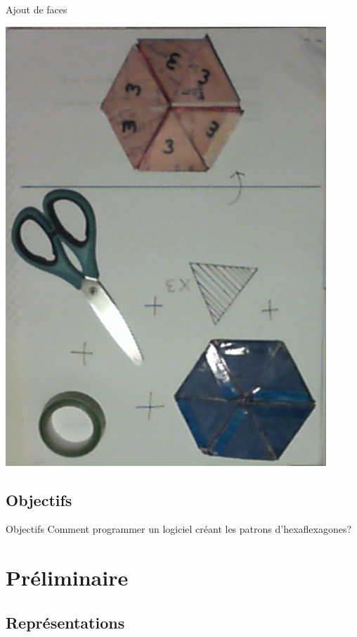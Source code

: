 \documentclass[french,xcolor=dvipsnames]{beamer}
\begin{document}
		\begin{frame}{Ajout de faces}
		
		\begin{center}
		\includegraphics[scale=0.3]{outils_ajout_face.png}
		\end{center}
		\end{frame}
		
		\subsection{Objectifs}
		\begin{frame}{Objectifs}
			Comment programmer un logiciel créant les patrons d'hexaflexagones?
		\end{frame}


	\section{Préliminaire}

		\subsection{Représentations}
\end{document}

